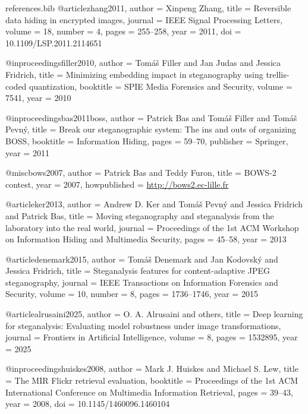 \begin{filecontents*}{references.bib}
@article{zhang2011,
  author    = {Xinpeng Zhang},
  title     = {Reversible data hiding in encrypted images},
  journal   = {IEEE Signal Processing Letters},
  volume    = {18},
  number    = {4},
  pages     = {255--258},
  year      = {2011},
  doi       = {10.1109/LSP.2011.2114651}
}

@inproceedings{filler2010,
  author    = {Tom{\'a}{\v{s}} Filler and Jan Judas and Jessica Fridrich},
  title     = {Minimizing embedding impact in steganography using trellis-coded quantization},
  booktitle = {SPIE Media Forensics and Security},
  volume    = {7541},
  year      = {2010}
}

@inproceedings{bas2011boss,
  author    = {Patrick Bas and Tom{\'a}{\v{s}} Filler and Tom{\'a}{\v{s}} Pevn{\'y}},
  title     = {Break our steganographic system: The ins and outs of organizing {BOSS}},
  booktitle = {Information Hiding},
  pages     = {59--70},
  publisher = {Springer},
  year      = {2011}
}

@misc{bows2007,
  author       = {Patrick Bas and Teddy Furon},
  title        = {{BOWS-2} contest},
  year         = {2007},
  howpublished = {\url{http://bows2.ec-lille.fr}}
}

@article{ker2013,
  author    = {Andrew D. Ker and Tom{\'a}{\v{s}} Pevn{\'y} and Jessica Fridrich and Patrick Bas},
  title     = {Moving steganography and steganalysis from the laboratory into the real world},
  journal   = {Proceedings of the 1st ACM Workshop on Information Hiding and Multimedia Security},
  pages     = {45--58},
  year      = {2013}
}

@article{denemark2015,
  author    = {Tom{\'a}{\v{s}} Denemark and Jan Kodovsk{\'y} and Jessica Fridrich},
  title     = {Steganalysis features for content-adaptive {JPEG} steganography},
  journal   = {IEEE Transactions on Information Forensics and Security},
  volume    = {10},
  number    = {8},
  pages     = {1736--1746},
  year      = {2015}
}

@article{alrusaini2025,
  author    = {O. A. Alrusaini and others},
  title     = {Deep learning for steganalysis: Evaluating model robustness under image transformations},
  journal   = {Frontiers in Artificial Intelligence},
  volume    = {8},
  pages     = {1532895},
  year      = {2025}
}

@inproceedings{huiskes2008,
  author    = {Mark J. Huiskes and Michael S. Lew},
  title     = {The {MIR} {Flickr} retrieval evaluation},
  booktitle = {Proceedings of the 1st ACM International Conference on Multimedia Information Retrieval},
  pages     = {39--43},
  year      = {2008},
  doi       = {10.1145/1460096.1460104}
}
\end{filecontents*}

